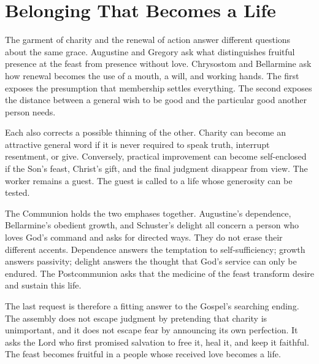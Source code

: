 \section{Belonging That Becomes a Life}

The garment of charity and the renewal of action answer different
questions about the same grace. Augustine and Gregory ask what
distinguishes fruitful presence at the feast from presence without
love. Chrysostom and Bellarmine ask how renewal becomes the use
of a mouth, a will, and working hands. The first exposes the
presumption that membership settles everything. The second
exposes the distance between a general wish to be good and
the particular good another person needs.

Each also corrects a possible thinning of the other. Charity
can become an attractive general word if it is never required
to speak truth, interrupt resentment, or give. Conversely,
practical improvement can become self-enclosed if the Son's
feast, Christ's gift, and the final judgment disappear from
view. The worker remains a guest. The guest is called to a
life whose generosity can be tested.

The Communion holds the two emphases together. Augustine's
dependence, Bellarmine's obedient growth, and Schuster's
delight all concern a person who loves God's command and
asks for directed ways. They do not erase their different
accents. Dependence answers the temptation to self-sufficiency;
growth answers passivity; delight answers the thought that
God's service can only be endured. The Postcommunion asks
that the medicine of the feast transform desire and sustain
this life.

The last request is therefore a fitting answer to the
Gospel's searching ending. The assembly does not escape
judgment by pretending that charity is unimportant, and it
does not escape fear by announcing its own perfection.
It asks the Lord who first promised salvation to free it,
heal it, and keep it faithful. The feast becomes fruitful
in a people whose received love becomes a life.
